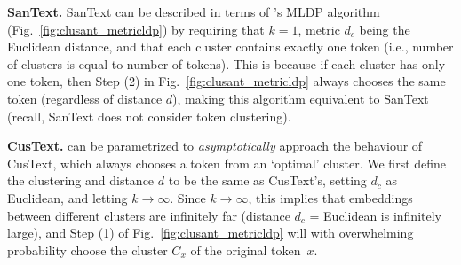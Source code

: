 \vspace{0.5em}

\noindent
\textbf{SanText.} SanText can be described in terms of \clusant's MLDP algorithm (Fig.~\ref{fig:clusant_metricldp}) by requiring that $k = 1$, metric $d_c$ being the Euclidean distance, and that each cluster contains exactly one token (i.e., number of clusters is equal to number of tokens). This is because if each cluster has only one token, then Step (2) in Fig.~\ref{fig:clusant_metricldp} always chooses the same token (regardless of distance $d$), making this algorithm equivalent to SanText (recall, SanText does not consider token clustering).

\vspace{0.5em}

\noindent
\textbf{CusText.} \clusant can be parametrized to {\em asymptotically} approach the behaviour of CusText, which always chooses a token from an `optimal' cluster. We first define the clustering and distance $d$ to be the same as CusText's, setting $d_c$ as Euclidean, and letting $k \rightarrow \infty$. Since $k \rightarrow \infty$, this implies that embeddings between different clusters are infinitely far (distance $d_c$ = Euclidean is infinitely large), and Step (1) of Fig.~\ref{fig:clusant_metricldp} will with overwhelming probability choose the cluster $C_x$ of the original token~$x$.